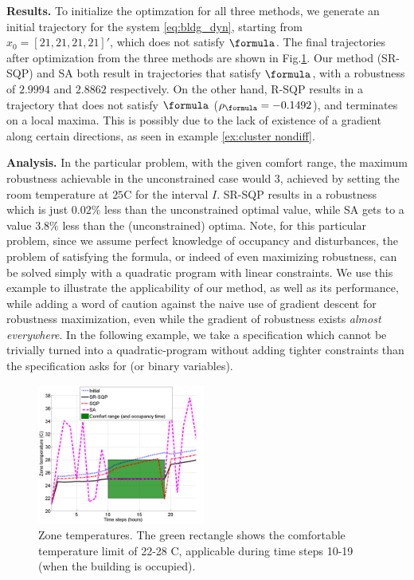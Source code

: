 \textbf{Results.} To initialize the optimzation for all three methods, we generate an initial trajectory for the system \eqref{eq:bldg_dyn}, starting from $x_0=[21,21,21,21]'$, which does not satisfy $\formula$. The final trajectories after optimization from the three methods are shown in Fig.\ref{fig:ZoneTemp}. Our method (SR-SQP) and SA both result in trajectories that satisfy $\formula$, with a robustness of $2.9994$ and $2.8862$ respectively. On the other hand, R-SQP results in a trajectory that does not satisfy $\formula$ ($\rob_{\formula} = -0.1492$), and terminates on a local maxima. This is possibly due to the lack of existence of a gradient along certain directions, as seen in example \ref{ex:cluster nondiff}.

\textbf{Analysis.} In the particular problem, with the given comfort range, the maximum robustness achievable in the unconstrained case would $3$, achieved by setting the room temperature at $25$C for the interval $I$. SR-SQP results in a robustness which is just $0.02\%$ less than the unconstrained optimal value, while SA gets to a value $3.8\%$ less than the (unconstrained) optima. Note, for this particular problem, since we assume perfect knowledge of occupancy and disturbances, the problem of satisfying the formula, or indeed of even maximizing robustness, can be solved simply with a quadratic program with linear constraints. We use this example to illustrate the applicability of our method, as well as its performance, while adding a word of caution against the naive use of gradient descent for robustness maximization, even while the gradient of robustness exists \textit{almost everywhere}. In the following example, we take a specification which cannot be trivially turned into a quadratic-program without adding tighter constraints than the specification asks for (or binary variables).


\begin{figure}[t]
\centering
\includegraphics[width=0.49\textwidth]{figures/ZoneTemp_scissored}
\vspace{-20pt}
\caption{\small{Zone temperatures. The green rectangle shows the comfortable temperature limit of 22-28 C, applicable during time steps 10-19 (when the building is occupied).}}
\label{fig:ZoneTemp}
\vspace{-10pt}
\end{figure}

